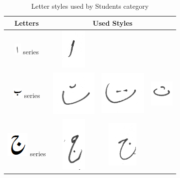 \begin{table}[h]
\centering
\caption{Letter styles used by Students category}\label{tab6-student}
\begin{tabular}{@{}cccc@{}}
\hline
Letters	& \multicolumn{3}{c}{\textbf{Used Styles}} \\ \hline
\includegraphics[scale=0.50]{alif.png} series & \includegraphics[scale=0.25]{182} &  &   \\ 
\hline
\includegraphics[scale=0.50]{bay} series & \includegraphics[scale=0.15]{183} & \includegraphics[scale=0.20]{184} &
\includegraphics[scale=0.20]{185}  \\
\hline
\includegraphics[scale=0.25]{jeeem} series & \includegraphics[scale=0.20]{186} & \includegraphics[scale=0.20]{187} &

\end{tabular}
\end{table}
